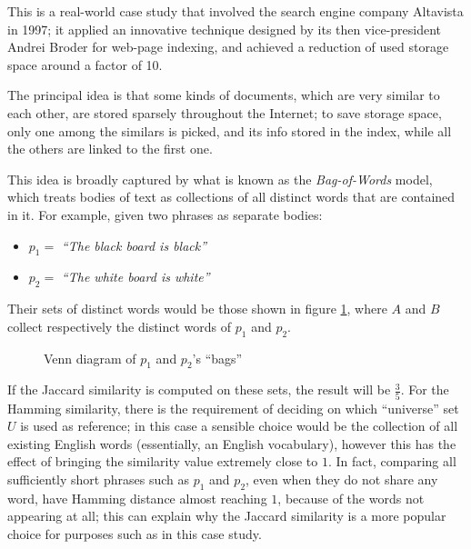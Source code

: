 This is a real-world case study that involved the search engine company Altavista in 1997; it applied an innovative technique designed by its then vice-president Andrei Broder for web-page indexing, and achieved a reduction of used storage space around a factor of 10.

The principal idea is that some kinds of documents, which are very similar to each other, are stored sparsely throughout the Internet; to save storage space, only one among the similars is picked, and its info stored in the index, while all the others are linked to the first one.

This idea is broadly captured by what is known as the \emph{Bag-of-Words} model\footnotemark, which treats bodies of text as collections of all distinct words that are contained in it. For example, given two phrases as separate bodies:


\begin{itemize}
    \item $p_1 = $ \textit{``The black board is black''}
    \item $p_2 = $ \textit{``The white board is white''}
\end{itemize}

Their sets of distinct words would be those shown in figure \ref{fig:bow_venn}, where $A$ and $B$ collect respectively the distinct words of $p_1$ and $p_2$.

\begin{figure}[ht]
    \centering
    
    \caption{Venn diagram of $p_1$ and $p_2$'s ``bags''}
    \label{fig:bow_venn}
\end{figure}

If the Jaccard similarity is computed on these sets, the result will be $\frac{3}{5}$. For the Hamming similarity, there is the requirement of deciding on which ``universe'' set $U$ is used as reference; in this case a sensible choice would be the collection of all existing English words (essentially, an English vocabulary), however this has the effect of bringing the similarity value extremely close to $1$. In fact, comparing all sufficiently short phrases such as $p_1$ and $p_2$, even when they do not share any word, have Hamming distance almost reaching $1$, because of the words not appearing at all; this can explain why the Jaccard similarity is a more popular choice for purposes such as in this case study.

